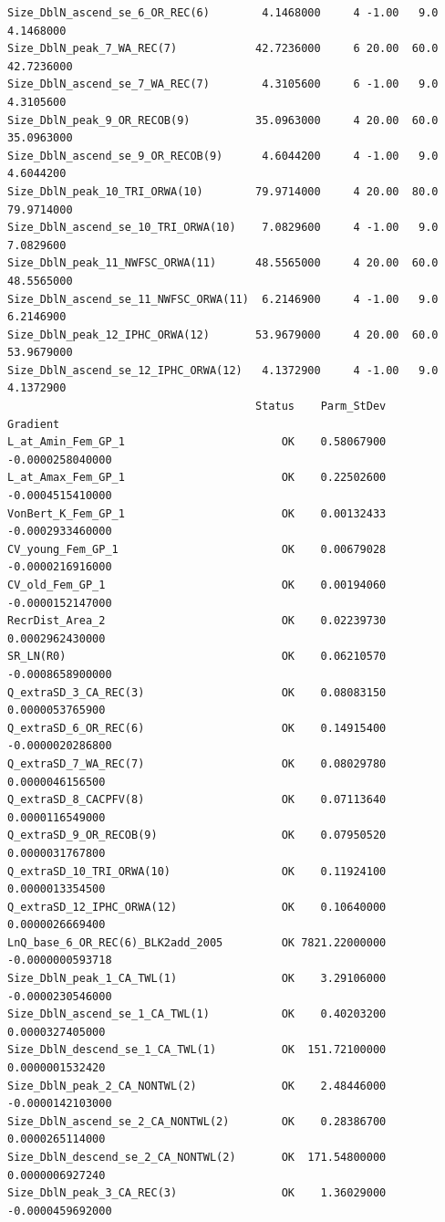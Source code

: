\documentclass[
]{scrartcl}
\begin{document}
\begin{verbatim}
Size_DblN_ascend_se_6_OR_REC(6)        4.1468000     4 -1.00   9.0  4.1468000
Size_DblN_peak_7_WA_REC(7)            42.7236000     6 20.00  60.0 42.7236000
Size_DblN_ascend_se_7_WA_REC(7)        4.3105600     6 -1.00   9.0  4.3105600
Size_DblN_peak_9_OR_RECOB(9)          35.0963000     4 20.00  60.0 35.0963000
Size_DblN_ascend_se_9_OR_RECOB(9)      4.6044200     4 -1.00   9.0  4.6044200
Size_DblN_peak_10_TRI_ORWA(10)        79.9714000     4 20.00  80.0 79.9714000
Size_DblN_ascend_se_10_TRI_ORWA(10)    7.0829600     4 -1.00   9.0  7.0829600
Size_DblN_peak_11_NWFSC_ORWA(11)      48.5565000     4 20.00  60.0 48.5565000
Size_DblN_ascend_se_11_NWFSC_ORWA(11)  6.2146900     4 -1.00   9.0  6.2146900
Size_DblN_peak_12_IPHC_ORWA(12)       53.9679000     4 20.00  60.0 53.9679000
Size_DblN_ascend_se_12_IPHC_ORWA(12)   4.1372900     4 -1.00   9.0  4.1372900
                                      Status    Parm_StDev         Gradient
L_at_Amin_Fem_GP_1                        OK    0.58067900 -0.0000258040000
L_at_Amax_Fem_GP_1                        OK    0.22502600 -0.0004515410000
VonBert_K_Fem_GP_1                        OK    0.00132433 -0.0002933460000
CV_young_Fem_GP_1                         OK    0.00679028 -0.0000216916000
CV_old_Fem_GP_1                           OK    0.00194060 -0.0000152147000
RecrDist_Area_2                           OK    0.02239730  0.0002962430000
SR_LN(R0)                                 OK    0.06210570 -0.0008658900000
Q_extraSD_3_CA_REC(3)                     OK    0.08083150  0.0000053765900
Q_extraSD_6_OR_REC(6)                     OK    0.14915400 -0.0000020286800
Q_extraSD_7_WA_REC(7)                     OK    0.08029780  0.0000046156500
Q_extraSD_8_CACPFV(8)                     OK    0.07113640  0.0000116549000
Q_extraSD_9_OR_RECOB(9)                   OK    0.07950520  0.0000031767800
Q_extraSD_10_TRI_ORWA(10)                 OK    0.11924100  0.0000013354500
Q_extraSD_12_IPHC_ORWA(12)                OK    0.10640000  0.0000026669400
LnQ_base_6_OR_REC(6)_BLK2add_2005         OK 7821.22000000 -0.0000000593718
Size_DblN_peak_1_CA_TWL(1)                OK    3.29106000 -0.0000230546000
Size_DblN_ascend_se_1_CA_TWL(1)           OK    0.40203200  0.0000327405000
Size_DblN_descend_se_1_CA_TWL(1)          OK  151.72100000  0.0000001532420
Size_DblN_peak_2_CA_NONTWL(2)             OK    2.48446000 -0.0000142103000
Size_DblN_ascend_se_2_CA_NONTWL(2)        OK    0.28386700  0.0000265114000
Size_DblN_descend_se_2_CA_NONTWL(2)       OK  171.54800000  0.0000006927240
Size_DblN_peak_3_CA_REC(3)                OK    1.36029000 -0.0000459692000

\end{verbatim}
\end{document}
